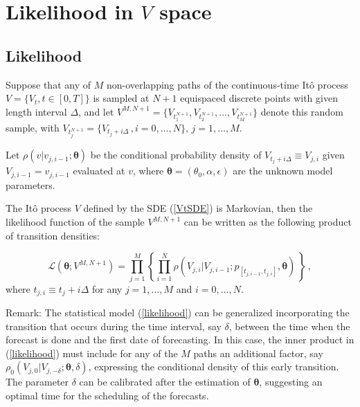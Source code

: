 \documentclass[11pt]{article}
\theoremstyle{definition}
\begin{document}

\section{Likelihood in $V$ space} \label{Section_4}

\subsection{Likelihood}

Suppose that any of $M$ non-overlapping paths of the continuous-time It\^{o} process $V = \{ V_t, t  \in [0,T] \}$ is sampled at $N + 1$ equispaced discrete points with given length interval $\Delta$, and let $ V^{M,N + 1}=\{ V_{t_1^{N + 1}} , V_{t_2^{N + 1}} ,\ldots , V_{t_M^{N + 1}} \}$ denote this random sample, with $V_{t_j^{N + 1}} = \{ V_{t_j + i \Delta}\,, i = 0, \ldots, N \}, \, j = 1, \ldots, M$. 

Let $\rho(v \vert v_{j, i-1} ; \bm{\theta})$ be the conditional probability density of $V_{t_j + i \Delta} \equiv V_{j, i}$ given $V_{j, i-1} = v_{j, i-1}$ evaluated at $v$, where $\bm{\theta} = (\theta_0, \alpha, \epsilon)$ are the unknown model parameters.

The It\^{o} process $V$ defined by the SDE (\ref{VtSDE}) is Markovian, then the likelihood function of the sample $ V^{M,N + 1}$ can be written as the following product of transition densities:  

\begin{equation}
\mathcal{L}(\bm{\theta}; V^{M,N +1}) = \prod\limits_{j=1}^M \left\{ \prod\limits_{i=1}^N \rho ( {V_{j, i}| V_{j, i-1}} ; p_{[t_{j,  i-1}, t_{j , i} ]},  \bm{\theta} )  \,  \right\} \,,
\label{likelihood}
\end{equation}
where $t_{j ,i} \equiv  t_j + i \Delta$ for any $j = 1, \ldots, M$ and $i = 0, \ldots, N$.

 {\color{red} Remark: The statistical model (\ref{likelihood}) can be generalized incorporating the transition that occurs during the time interval, say $\delta$, between the time when the forecast is done and the first date of forecasting. In this case, the inner product in  (\ref{likelihood}) must include for any of the $M$ paths an additional factor, say $\rho_0 (V_{j, 0}|V_{j, -\delta};\bm{\theta},\delta)$, expressing the conditional density of this early transition. The parameter $\delta$ can be calibrated after the estimation of $\bm{\theta}$, suggesting an optimal time for the scheduling of the forecasts.}
\end{document}
